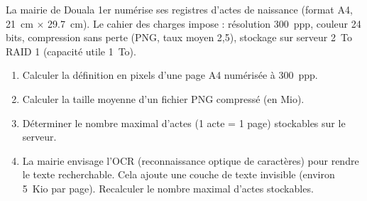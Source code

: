 \documentclass[11pt]{article}
\begin{document}
\begin{exercice}
La mairie de Douala 1er numérise ses registres d'actes de naissance (format A4, \SI{21}{cm} $\times$ \SI{29,7}{cm}). Le cahier des charges impose : résolution \SI{300}{ppp}, couleur 24 bits, compression sans perte (PNG, taux moyen 2,5), stockage sur serveur \SI{2}{To} RAID 1 (capacité utile \SI{1}{To}).
\begin{enumerate}
    \item Calculer la définition en pixels d'une page A4 numérisée à \SI{300}{ppp}.
    \item Calculer la taille moyenne d'un fichier PNG compressé (en Mio).
    \item Déterminer le nombre maximal d'actes (1 acte = 1 page) stockables sur le serveur.
    \item La mairie envisage l'OCR (reconnaissance optique de caractères) pour rendre le texte recherchable. Cela ajoute une couche de texte invisible (environ \SI{5}{Kio} par page). Recalculer le nombre maximal d'actes stockables.
\end{enumerate}
\end{exercice}
\end{document}
